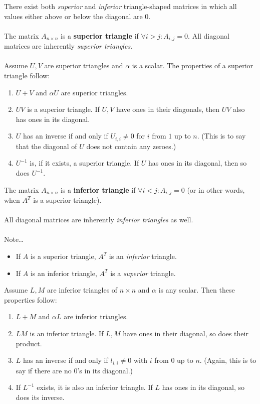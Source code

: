 \documentclass[12pt]{article}
\begin{document}
There exist both \emph{superior} and \emph{inferior} triangle-shaped matrices in which all values either above or below the diagonal are $0$. \\ \\

The matrix $A_{n\times n}$ is a \textbf{superior triangle} if $\forall i > j: A_{i,j} = 0$. All diagonal matrices are inherently \emph{superior triangles}. \\ \\

Assume $U, V$ are superior triangles and $\alpha$ is a scalar. The properties of a superior triangle follow:

\begin{enumerate}
    \item $U + V$ and $\alpha U$ are superior triangles.
    \item $UV$ is a superior triangle. If $U, V$ have ones in their diagonals, then $UV$ also has ones in its diagonal.
    \item $U$ has an inverse if and only if $U_{i,i} \neq 0$ for $i$ from $1$ up to $n$.
    (This is to say that the diagonal of $U$ does not contain any zeroes.)
    \item $U^{-1}$ is, if it exists, a superior triangle. If $U$ has ones in its diagonal, then so does $U^{-1}$.
\end{enumerate}

The matrix $A_{n \times n}$ is a \textbf{inferior triangle} if $\forall i < j: A_{i,j} = 0$
(or in other words, when $A^T$ is a superior triangle). \\ \\

All diagonal matrices are inherently \emph{inferior triangles} as well. \\ \\

Note\dots

\begin{itemize}
    \item If $A$ is a superior triangle, $A^T$ is an \emph{inferior} triangle.
    \item If $A$ is an inferior triangle, $A^T$ is a \emph{superior} triangle.
\end{itemize}

Assume $L, M$ are inferior triangles of ${n\times n}$ and $\alpha$ is any scalar. Then these properties follow:

\begin{enumerate}
    \item $L + M$ and $\alpha L$ are inferior triangles.
    \item $LM$ is an inferior triangle. If $L, M$ have ones in their diagonal, so does their product.
    \item $L$ has an inverse if and only if $l_{i,i} \neq 0$ with $i$ from $0$ up to $n$.
    (Again, this is to say if there are no $0$'s in its diagonal.)
    \item If $L^{-1}$ exists, it is also an inferior triangle. If $L$ has ones in its diagonal, so does its inverse.
\end{enumerate}
\end{document}
